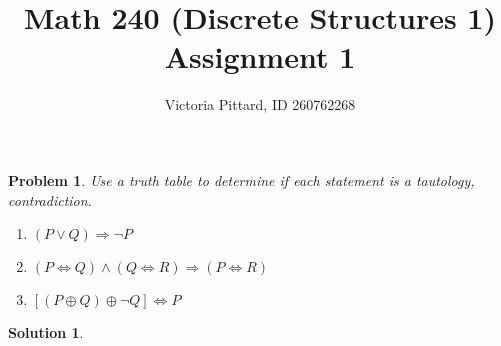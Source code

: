 \documentclass{article}
\newtheorem{problem}{Problem}
\theoremstyle{definition}
\newtheorem*{solution}{Solution}
\begin{document}
\title{Math 240 (Discrete Structures 1) Assignment 1}
\author{Victoria Pittard, ID 260762268}
\date{}

\maketitle

\begin{problem}
Use a truth table to determine if each statement is a tautology, contradiction.
\end{problem}

\begin{enumerate} [label=\alph*)]

\item $(P \vee Q) \Rightarrow \neg P$

\item $(P \Leftrightarrow Q) \wedge (Q \Leftrightarrow R) \Rightarrow (P \Leftrightarrow R)$

\item $[(P \oplus Q) \oplus \neg Q] \Leftrightarrow P$

\end{enumerate}


\begin{solution}
\end{solution}
\end{document}
